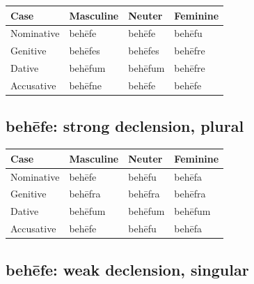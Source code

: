 \par\begingroup
\fontsize{10.5}{13.2}\selectfont
\setlength{\LTleft}{0pt}\setlength{\LTright}{\fill}
\noindent
\begin{tabular}{@{}>{\raggedright\arraybackslash}p{28.89mm}>{\raggedright\arraybackslash}p{28.89mm}>{\raggedright\arraybackslash}p{28.89mm}>{\raggedright\arraybackslash}p{28.89mm}@{}}
\toprule
\textbf{Case} & \textbf{Masculine} & \textbf{Neuter} & \textbf{Feminine} \\
\midrule
Nominative & behēfe & behēfe & behēfu \\
Genitive & behēfes & behēfes & behēfre \\
Dative & behēfum & behēfum & behēfre \\
Accusative & behēfne & behēfe & behēfe \\
\bottomrule
\end{tabular}
\par\endgroup

\subsection*{behēfe: strong declension, plural}

\par\begingroup
\fontsize{10.5}{13.2}\selectfont
\setlength{\LTleft}{0pt}\setlength{\LTright}{\fill}
\noindent
\begin{tabular}{@{}>{\raggedright\arraybackslash}p{28.89mm}>{\raggedright\arraybackslash}p{28.89mm}>{\raggedright\arraybackslash}p{28.89mm}>{\raggedright\arraybackslash}p{28.89mm}@{}}
\toprule
\textbf{Case} & \textbf{Masculine} & \textbf{Neuter} & \textbf{Feminine} \\
\midrule
Nominative & behēfe & behēfu & behēfa \\
Genitive & behēfra & behēfra & behēfra \\
Dative & behēfum & behēfum & behēfum \\
Accusative & behēfe & behēfu & behēfa \\
\bottomrule
\end{tabular}
\par\endgroup

\subsection*{behēfe: weak declension, singular}

